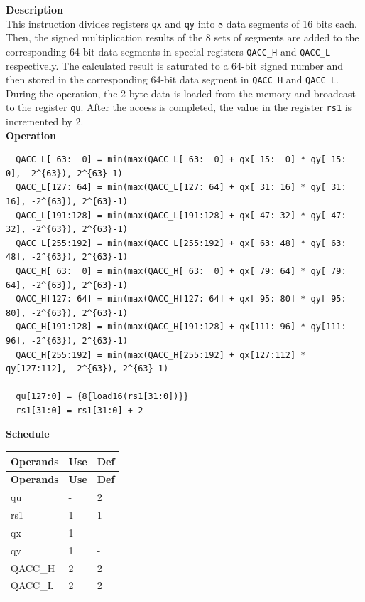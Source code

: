 \textbf{Description}\\
This instruction divides registers \lstinline{qx} and \lstinline{qy} into 8 data segments of 16 bits each. Then, the signed multiplication results of the 8 sets of segments are added to the corresponding 64-bit data segments in special registers \lstinline{QACC_H} and \lstinline{QACC_L} respectively. The calculated result is saturated to a 64-bit signed number and then stored in the corresponding 64-bit data segment in \lstinline{QACC_H} and \lstinline{QACC_L}.\\
During the operation, the 2-byte data is loaded from the memory and broadcast to the register \lstinline{qu}. After the access is completed, the value in the register \lstinline{rs1} is incremented by 2.\\
\textbf{Operation}
\begin{lstlisting}
  QACC_L[ 63:  0] = min(max(QACC_L[ 63:  0] + qx[ 15:  0] * qy[ 15:  0], -2^{63}), 2^{63}-1)
  QACC_L[127: 64] = min(max(QACC_L[127: 64] + qx[ 31: 16] * qy[ 31: 16], -2^{63}), 2^{63}-1)
  QACC_L[191:128] = min(max(QACC_L[191:128] + qx[ 47: 32] * qy[ 47: 32], -2^{63}), 2^{63}-1)
  QACC_L[255:192] = min(max(QACC_L[255:192] + qx[ 63: 48] * qy[ 63: 48], -2^{63}), 2^{63}-1)
  QACC_H[ 63:  0] = min(max(QACC_H[ 63:  0] + qx[ 79: 64] * qy[ 79: 64], -2^{63}), 2^{63}-1)
  QACC_H[127: 64] = min(max(QACC_H[127: 64] + qx[ 95: 80] * qy[ 95: 80], -2^{63}), 2^{63}-1)
  QACC_H[191:128] = min(max(QACC_H[191:128] + qx[111: 96] * qy[111: 96], -2^{63}), 2^{63}-1)
  QACC_H[255:192] = min(max(QACC_H[255:192] + qx[127:112] * qy[127:112], -2^{63}), 2^{63}-1)

  qu[127:0] = {8{load16(rs1[31:0])}}
  rs1[31:0] = rs1[31:0] + 2
\end{lstlisting}

\textbf{Schedule}\\
\begin{longtable}[c]{|l|l|l|}
    \hline
    \rowcolor{lightgray}
    \textbf{Operands} & \textbf{Use} & \textbf{Def} \\\hline
    \endfirsthead
    \hline
    \rowcolor{lightgray}
     \textbf{Operands} & \textbf{Use} & \textbf{Def} \\\hline
    \endhead
    \hline
    \endfoot

    qu & - & 2 \\\hline
    rs1 & 1 & 1 \\\hline
     qx & 1 & - \\\hline
     qy & 1 & - \\\hline
     QACC\_H & 2 & 2 \\\hline
     QACC\_L & 2 & 2

\end{longtable}

